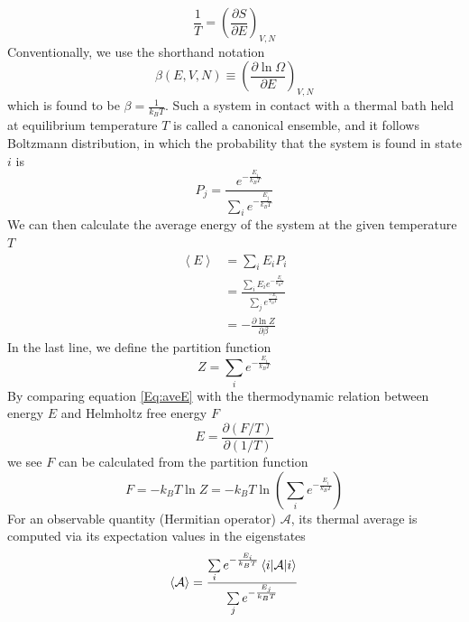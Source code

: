 \documentclass[letterpaper,12pt]{article}
\numberwithin{equation}{section}
\begin{document}
\begin{equation}
    \frac{1}{T}=\left(\frac{\partial S}{\partial E}\right)_{V,N}
\end{equation}
Conventionally, we use the shorthand notation 
\begin{equation}
    \beta(E,V,N)\equiv \left(\frac{\partial \ln\Omega}{\partial E}\right)_{V,N}
\end{equation} 
which is found to be $\beta=\frac{1}{k_B T}$. Such a system in contact with a thermal bath held at equilibrium temperature $T$ is called a canonical ensemble, and it follows Boltzmann distribution, in which the probability that the system is found in state $i$ is
\begin{equation}
    P_j=\frac{e^{-\frac{E_i}{k_B T}}}{\sum\limits_i e^{-\frac{E_j}{k_B T}}}
\end{equation}
We can then calculate the average energy of the system at the given temperature $T$
\begin{equation}
    \begin{aligned}
        \left\langle E\right\rangle &=\sum\limits_{i}{E_iP_i} \\
        &= \frac{\sum\limits_{i}{E_i}e^{-\frac{E_i}{k_B T}}}{\sum\limits_{j}{e^{\frac{-E_j}{k_B T}}}} \\
        &=-\frac{\partial \ln Z}{\partial \beta}
    \end{aligned}
    \label{Eq:aveE}
\end{equation}
In the last line, we define the partition function 
\begin{equation}
    Z=\sum\limits_{i}e^{-\frac{E_i}{k_BT}}
\end{equation}
By comparing equation \ref{Eq:aveE} with the thermodynamic relation between energy $E$ and Helmholtz free energy $F$
\begin{equation}
    E=\frac{\partial (F/T)}{\partial (1/T)}
\end{equation}
we see $F$ can be calculated from the partition function
\begin{equation}
    F=-k_B T\ln Z=-k_BT\ln \left(\sum\limits_{i}e^{-\frac{E_i}{k_BT}}\right)
\end{equation}
For an observable quantity (Hermitian operator) $\mathcal{A}$, its thermal average is computed via its expectation values in the eigenstates
\begin{equation}
    \left\langle \mathcal{A}\right\rangle=\frac{\sum\limits_i {e^{-\frac{E_i}{k_BT}}\matrixel{i}{\mathcal{A}}{i}}}{\sum\limits_j{e^{-\frac{E_j}{k_BT}}}}
\end{equation}
\end{document}
